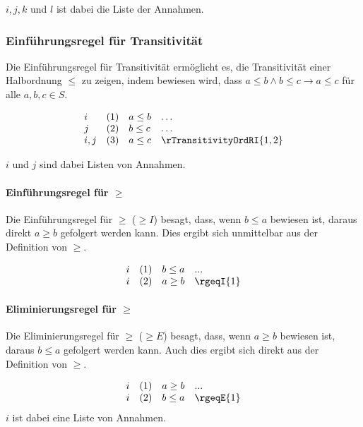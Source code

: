\documentclass[main.tex]{subfiles}
\begin{document}
\(i,j,k\) und \(l\) ist dabei die Liste der Annahmen.

\subsubsection*{Einführungsregel für Transitivität}
\label{rule:rTransitivityOrdRI}
Die Einführungsregel für Transitivität ermöglicht es, die Transitivität einer Halbordnung \(\leq\) zu zeigen, indem bewiesen wird, dass \(a \leq b \land b \leq c \rightarrow a \leq c\) für alle \(a, b, c \in S\).

\[
\begin{array}{llll}
    i           & (1) & a \leq b & \dots \\
    j           & (2) & b \leq c & \dots \\
    i,j         & (3) & a \leq c & \rTransitivityOrdRI{1,2}
\end{array}
\]

\(i\) und \(j\) sind dabei Listen von Annahmen.

\paragraph{Einführungsregel für \(\geq\)}
\label{rule:rgeqI}
Die Einführungsregel für \(\geq\) (\(\geq I\)) besagt, dass, wenn \(b \leq a\) bewiesen ist, daraus direkt \(a \geq b\) gefolgert werden kann. Dies ergibt sich unmittelbar aus der Definition von \(\geq\).

\[
\begin{array}{llll}
    i & (1) & b \leq a & \text{...} \\
    i & (2) & a \geq b & \rgeqI{1} \\
\end{array}
\]

\paragraph{Eliminierungsregel für \(\geq\) }
\label{rule:rgeqE}
Die Eliminierungsregel für \(\geq\) (\(\geq E\)) besagt, dass, wenn \(a \geq b\) bewiesen ist, daraus \(b \leq a\) gefolgert werden kann. Auch dies ergibt sich direkt aus der Definition von \(\geq\).

\[
\begin{array}{llll}
    i & (1) & a \geq b & \text{...} \\
    i & (2) & b \leq a & \rgeqE{1} \\
\end{array}
\]
\(i\) ist dabei eine Liste von Annahmen.
\end{document}
